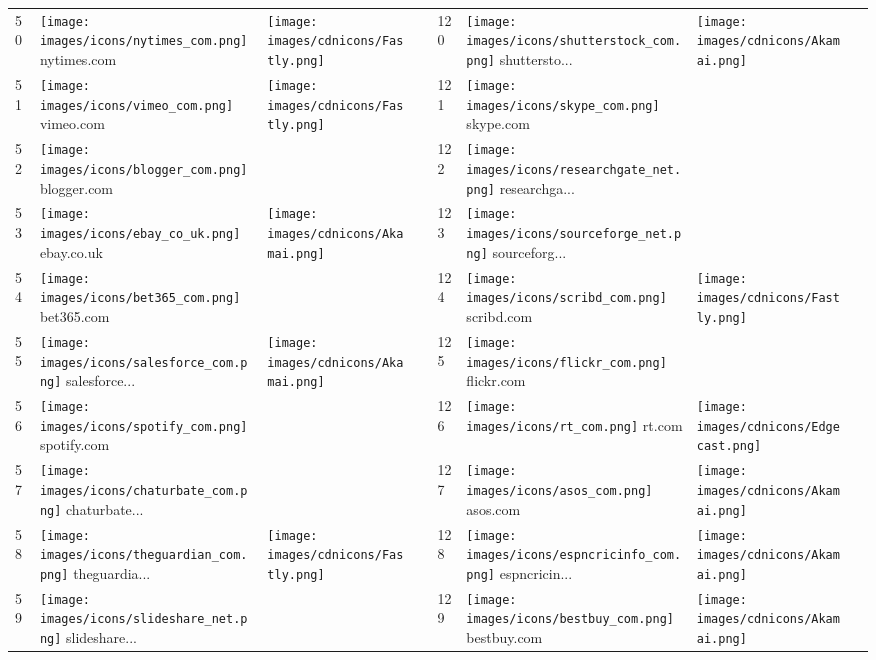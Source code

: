 \begin{table}[tbp]
\begin{tabular}{|llll|llll|}
50 & \texttt{[image: images/icons/nytimes\_com.png]} nytimes.com & \texttt{[image: images/cdnicons/Fastly.png]} & & 120 & \texttt{[image: images/icons/shutterstock\_com.png]} shuttersto... & \texttt{[image: images/cdnicons/Akamai.png]} & \\
51 & \texttt{[image: images/icons/vimeo\_com.png]} vimeo.com & \texttt{[image: images/cdnicons/Fastly.png]} & & 121 & \texttt{[image: images/icons/skype\_com.png]} skype.com & & \\
52 & \texttt{[image: images/icons/blogger\_com.png]} blogger.com & & & 122 & \texttt{[image: images/icons/researchgate\_net.png]} researchga... & & \\
53 & \texttt{[image: images/icons/ebay\_co\_uk.png]} ebay.co.uk & \texttt{[image: images/cdnicons/Akamai.png]} & & 123 & \texttt{[image: images/icons/sourceforge\_net.png]} sourceforg... & & \\
54 & \texttt{[image: images/icons/bet365\_com.png]} bet365.com & & & 124 & \texttt{[image: images/icons/scribd\_com.png]} scribd.com & \texttt{[image: images/cdnicons/Fastly.png]} & \\
55 & \texttt{[image: images/icons/salesforce\_com.png]} salesforce... & \texttt{[image: images/cdnicons/Akamai.png]} & & 125 & \texttt{[image: images/icons/flickr\_com.png]} flickr.com & & \\
56 & \texttt{[image: images/icons/spotify\_com.png]} spotify.com & & & 126 & \texttt{[image: images/icons/rt\_com.png]} rt.com & \texttt{[image: images/cdnicons/Edgecast.png]} & \\
57 & \texttt{[image: images/icons/chaturbate\_com.png]} chaturbate... & & & 127 & \texttt{[image: images/icons/asos\_com.png]} asos.com & \texttt{[image: images/cdnicons/Akamai.png]} & \\
58 & \texttt{[image: images/icons/theguardian\_com.png]} theguardia... & \texttt{[image: images/cdnicons/Fastly.png]} & & 128 & \texttt{[image: images/icons/espncricinfo\_com.png]} espncricin... & \texttt{[image: images/cdnicons/Akamai.png]} & \\
59 & \texttt{[image: images/icons/slideshare\_net.png]} slideshare... & & & 129 & \texttt{[image: images/icons/bestbuy\_com.png]} bestbuy.com & \texttt{[image: images/cdnicons/Akamai.png]} & \\

\end{tabular}
\end{table}
